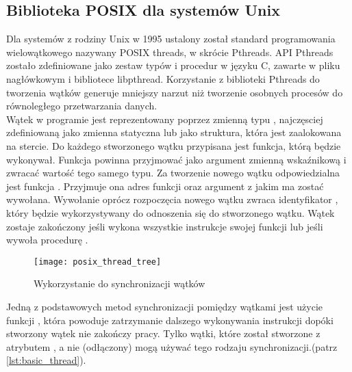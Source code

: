 \documentclass[document.tex]{subfiles}
\begin{document}
\subsection{Biblioteka POSIX dla systemów Unix}
\indent Dla systemów z rodziny Unix w 1995 ustalony został standard programowania 
wielowątkowego nazywany POSIX threads, w skrócie Pthreads. API Pthreads zostało zdefiniowane jako zestaw typów i procedur w języku C, zawarte w pliku nagłówkowym
 i bibliotece libpthread.\cite{POSIX_article}
Korzystanie z biblioteki Pthreads do tworzenia wątków generuje mniejszy narzut
niż tworzenie osobnych procesów do równoległego przetwarzania danych.\cite{POSIX_article} 
\\
\indent Wątek w programie jest reprezentowany poprzez zmienną typu , 
najczęsciej zdefiniowaną jako zmienna statyczna lub jako struktura, która jest zaalokowana na stercie.\cite{POSIX_Butenhof}\cite{POSIX_article}\cite{POSIX_tutorial} 
Do każdego stworzonego wątku przypisana jest funkcja, którą będzie wykonywał.
Funkcja powinna przyjmować jako argument zmienną wskaźnikową  i zwracać
wartość tego samego typu. Za tworzenie nowego wątku odpowiedzialna jest funkcja . Przyjmuje ona adres funkcji oraz argument z jakim ma zostać wywołana.
Wywołanie  oprócz rozpoczęcia nowego wątku zwraca identyfikator
, który będzie wykorzystywany do odnoszenia się do stworzonego wątku.
Wątek zostaje zakończony jeśli wykona wszystkie instrukcje swojej funkcji lub jeśli wywoła procedurę . \cite{POSIX_Butenhof}

\begin{figure}[h]
\texttt{[image: posix\_thread\_tree]}
\caption{Wykorzystanie  do synchronizacji wątków\protect\cite{POSIX_article}}
\label{fig:inspekcja}
\end{figure}

Jedną z podstawowych metod synchronizacji pomiędzy wątkami jest użycie funkcji , która powoduje zatrzymanie dalszego wykonywania instrukcji dopóki stworzony wątek nie zakończy pracy.
Tylko wątki, które został stworzone z atrybutem , 
a nie (odłączony) mogą używać tego rodzaju synchronizacji.\cite{POSIX_article}(patrz \ref{lst:basic_thread}). %
\\
 
\end{document}
